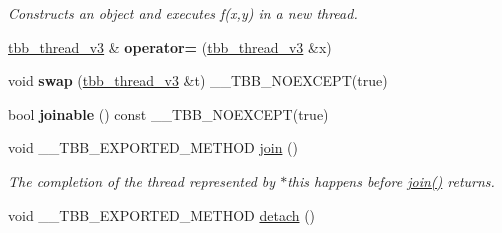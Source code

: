 \begin{DoxyCompactItemize}
\begin{DoxyCompactList}\small\item\em Constructs an object and executes f(x,y) in a new thread. \end{DoxyCompactList}\item 
\hypertarget{classtbb_1_1internal_1_1tbb__thread__v3_aa4f68564c30ee6f59bab29c3b3216623}{}\hyperlink{classtbb_1_1internal_1_1tbb__thread__v3}{tbb\+\_\+thread\+\_\+v3} \& {\bfseries operator=} (\hyperlink{classtbb_1_1internal_1_1tbb__thread__v3}{tbb\+\_\+thread\+\_\+v3} \&x)\label{classtbb_1_1internal_1_1tbb__thread__v3_aa4f68564c30ee6f59bab29c3b3216623}

\item 
\hypertarget{classtbb_1_1internal_1_1tbb__thread__v3_ab2e10af48f3f2482e9e7236f2e05714c}{}void {\bfseries swap} (\hyperlink{classtbb_1_1internal_1_1tbb__thread__v3}{tbb\+\_\+thread\+\_\+v3} \&t) \+\_\+\+\_\+\+T\+B\+B\+\_\+\+N\+O\+E\+X\+C\+E\+P\+T(true)\label{classtbb_1_1internal_1_1tbb__thread__v3_ab2e10af48f3f2482e9e7236f2e05714c}

\item 
\hypertarget{classtbb_1_1internal_1_1tbb__thread__v3_a4ddee0e2030f8fa947fd93f403178104}{}bool {\bfseries joinable} () const \+\_\+\+\_\+\+T\+B\+B\+\_\+\+N\+O\+E\+X\+C\+E\+P\+T(true)\label{classtbb_1_1internal_1_1tbb__thread__v3_a4ddee0e2030f8fa947fd93f403178104}

\item 
\hypertarget{classtbb_1_1internal_1_1tbb__thread__v3_ab312527ce3848c27e18eedbf881fb943}{}void \+\_\+\+\_\+\+T\+B\+B\+\_\+\+E\+X\+P\+O\+R\+T\+E\+D\+\_\+\+M\+E\+T\+H\+O\+D \hyperlink{classtbb_1_1internal_1_1tbb__thread__v3_ab312527ce3848c27e18eedbf881fb943}{join} ()\label{classtbb_1_1internal_1_1tbb__thread__v3_ab312527ce3848c27e18eedbf881fb943}

\begin{DoxyCompactList}\small\item\em The completion of the thread represented by $\ast$this happens before \hyperlink{classtbb_1_1internal_1_1tbb__thread__v3_ab312527ce3848c27e18eedbf881fb943}{join()} returns. \end{DoxyCompactList}\item 
\hypertarget{classtbb_1_1internal_1_1tbb__thread__v3_aed1dc35a70fc537682452a1c7bd77faf}{}void \+\_\+\+\_\+\+T\+B\+B\+\_\+\+E\+X\+P\+O\+R\+T\+E\+D\+\_\+\+M\+E\+T\+H\+O\+D \hyperlink{classtbb_1_1internal_1_1tbb__thread__v3_aed1dc35a70fc537682452a1c7bd77faf}{detach} ()\label{classtbb_1_1internal_1_1tbb__thread__v3_aed1dc35a70fc537682452a1c7bd77faf}


\end{DoxyCompactItemize}
